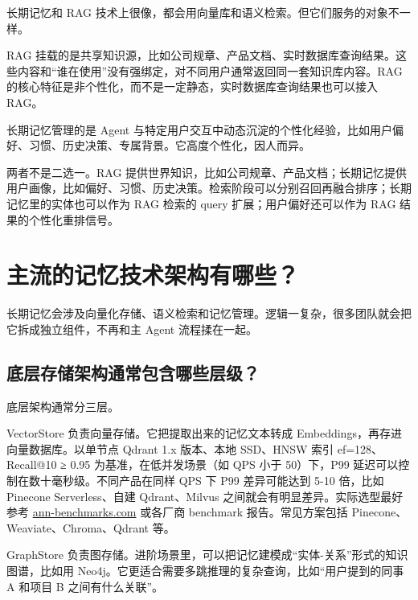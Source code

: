 \documentclass[9pt,a4paper,twocolumn]{ctexart}
\begin{document}
长期记忆和 RAG 技术上很像，都会用向量库和语义检索。但它们服务的对象不一样。



RAG 挂载的是共享知识源，比如公司规章、产品文档、实时数据库查询结果。这些内容和“谁在使用”没有强绑定，对不同用户通常返回同一套知识库内容。RAG 的核心特征是非个性化，而不是一定静态，实时数据库查询结果也可以接入 RAG。



长期记忆管理的是 Agent 与特定用户交互中动态沉淀的个性化经验，比如用户偏好、习惯、历史决策、专属背景。它高度个性化，因人而异。



两者不是二选一。RAG 提供世界知识，比如公司规章、产品文档；长期记忆提供用户画像，比如偏好、习惯、历史决策。检索阶段可以分别召回再融合排序；长期记忆里的实体也可以作为 RAG 检索的 query 扩展；用户偏好还可以作为 RAG 结果的个性化重排信号。



\section*{主流的记忆技术架构有哪些？}


长期记忆会涉及向量化存储、语义检索和记忆管理。逻辑一复杂，很多团队就会把它拆成独立组件，不再和主 Agent 流程揉在一起。



\subsection*{底层存储架构通常包含哪些层级？}


底层架构通常分三层。



VectorStore 负责向量存储。它把提取出来的记忆文本转成 Embeddings，再存进向量数据库。以单节点 Qdrant 1.x 版本、本地 SSD、HNSW 索引 ef=128、Recall@10 ≥ 0.95 为基准，在低并发场景（如 QPS 小于 50）下，P99 延迟可以控制在数十毫秒级。不同产品在同样 QPS 下 P99 差异可能达到 5-10 倍，比如 Pinecone Serverless、自建 Qdrant、Milvus 之间就会有明显差异。实际选型最好参考 \href{https://ann-benchmarks.com/}{ann-benchmarks.com} 或各厂商 benchmark 报告。常见方案包括 Pinecone、Weaviate、Chroma、Qdrant 等。



GraphStore 负责图存储。进阶场景里，可以把记忆建模成“实体-关系”形式的知识图谱，比如用 Neo4j。它更适合需要多跳推理的复杂查询，比如“用户提到的同事 A 和项目 B 之间有什么关联”。
\end{document}
